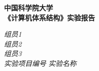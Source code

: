 \begin{center}
  \LARGE \bf 中国科学院大学 \\《计算机体系结构》实验报告
\end{center}

\begin{center}
  \emph{组员1} \underline{\makebox[40.8em][c]{\nameone}}\\ 
  \emph{组员2} \underline{\makebox[40.8em][c]{\nametwo}}\\
  \emph{组员3} \underline{\makebox[40.8em][c]{\namethree}}\\
  \emph{实验项目编号} \underline{\makebox[3em][c]{\labNum}}
  \emph{实验名称} \underline{\makebox[30em][c]{\labName}}\\
\end{center}
